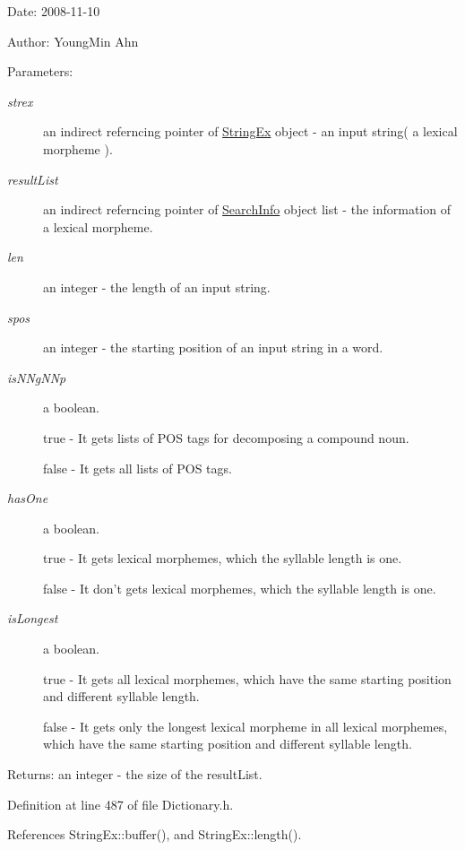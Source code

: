 \begin{Desc}
\item[Date:]2008-11-10 \end{Desc}
\begin{Desc}
\item[Author:]YoungMin Ahn \end{Desc}
\begin{Desc}
\item[Parameters:]
\begin{description}
\item[{\em strex}]an indirect referncing pointer of \hyperlink{classStringEx}{StringEx} object - an input string( a lexical morpheme ). \item[{\em resultList}]an indirect referncing pointer of \hyperlink{classSearchInfo}{SearchInfo} object list - the information of a lexical morpheme. \item[{\em len}]an integer - the length of an input string. \item[{\em spos}]an integer - the starting position of an input string in a word. \item[{\em isNNgNNp}]a boolean.\par
 true - It gets lists of POS tags for decomposing a compound noun.\par
 false - It gets all lists of POS tags. \item[{\em hasOne}]a boolean.\par
 true - It gets lexical morphemes, which the syllable length is one.\par
 false - It don't gets lexical morphemes, which the syllable length is one. \item[{\em isLongest}]a boolean.\par
 true - It gets all lexical morphemes, which have the same starting position and different syllable length.\par
 false - It gets only the longest lexical morpheme in all lexical morphemes, which have the same starting position and different syllable length. \end{description}
\end{Desc}
\begin{Desc}
\item[Returns:]an integer - the size of the resultList. \end{Desc}


Definition at line 487 of file Dictionary.h.

References StringEx::buffer(), and StringEx::length().

